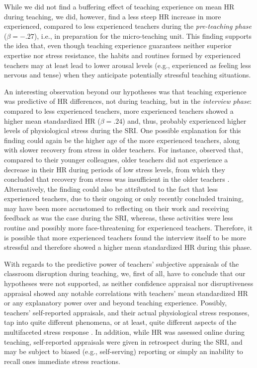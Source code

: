 \documentclass[preprint,
3p]{elsarticle} %
\begin{document}
While we did not find a buffering effect of teaching experience on mean
HR during teaching, we did, however, find a less steep HR increase in
more experienced, compared to less experienced teachers during the
\emph{pre-teaching phase} (\(\beta = -.27\)), i.e., in preparation for
the micro-teaching unit. This finding supports the idea that, even
though teaching experience guarantees neither superior expertise nor
stress resistance, the habits and routines formed by experienced
teachers may at least lead to lower arousal levels (e.g., experienced as
feeling less nervous and tense) when they anticipate potentially
stressful teaching situations.

An interesting observation beyond our hypotheses was that teaching
experience was predictive of HR differences, not during teaching, but in
the \emph{interview phase}: compared to less experienced teachers, more
experienced teachers showed a higher mean standardized HR
(\(\beta = .24\)) and, thus, probably experienced higher levels of
physiological stress during the SRI. One possible explanation for this
finding could again be the higher age of the more experienced teachers,
along with slower recovery from stress in older teachers. For instance,
\citet{ritvanen2006responses} observed that, compared to their younger
colleagues, older teachers did not experience a decrease in their HR
during periods of low stress levels, from which they concluded that
recovery from stress was insufficient in the older teachers
\citep{ritvanen2006responses}. Alternatively, the finding could also be
attributed to the fact that less experienced teachers, due to their
ongoing or only recently concluded training, may have been more
accustomed to reflecting on their work and receiving feedback as was the
case during the SRI, whereas, these activities were less routine and
possibly more face-threatening for experienced teachers. Therefore, it
is possible that more experienced teachers found the interview itself to
be more stressful and therefore showed a higher mean standardized HR
during this phase.

With regards to the predictive power of teachers' subjective appraisals
of the classroom disruption during teaching, we, first of all, have to
conclude that our hypotheses were not supported, as neither confidence
appraisal nor disruptiveness appraisal showed any notable correlations
with teachers' mean standardized HR or any explanatory power over and
beyond teaching experience. Possibly, teachers' self-reported
appraisals, and their actual physiological stress responses, tap into
quite different phenomena, or at least, quite different aspects of the
multifaceted stress response \citep{kyriacou1978}. In addition, while HR
was assessed online during teaching, self-reported appraisals were given
in retrospect during the SRI, and may be subject to biased (e.g.,
self-serving) reporting or simply an inability to recall ones immediate
stress reactions.
\end{document}
